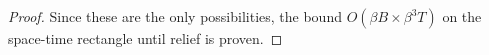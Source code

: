\documentclass[11pt]{memoir}
\theoremstyle{definition} %
\def\B{B}
\newcommand{\Tu}{T}
\begin{document}
\begin{proof}
Since these are the only possibilities, the bound \( O(\beta\B\times\beta^{3}\Tu) \)
on the space-time rectangle until relief is proven.
%
%
%
%
%
%
%
%

\end{proof}
\end{document}
